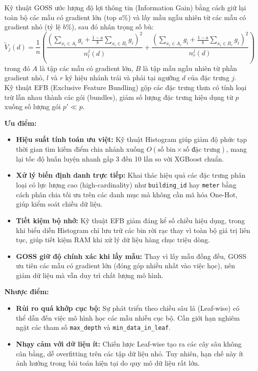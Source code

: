 Kỹ thuật GOSS ước lượng độ lợi thông tin (Information Gain) bằng cách giữ lại toàn bộ các mẫu có gradient lớn (top $a\%$) và lấy mẫu ngẫu nhiên từ các mẫu có gradient nhỏ (tỷ lệ $b\%$), sau đó nhân trọng số bù:
\begin{equation*}
    \widetilde{V}_j(d) = \frac{1}{n} \left( \frac{\left(\sum_{x_i \in A_l} g_i + \frac{1-a}{b} \sum_{x_i \in B_l} g_i\right)^2}{n_l^j(d)} + \frac{\left(\sum_{x_i \in A_r} g_i + \frac{1-a}{b} \sum_{x_i \in B_r} g_i\right)^2}{n_r^j(d)} \right)
\end{equation*}
trong đó $A$ là tập các mẫu có gradient lớn, $B$ là tập mẫu ngẫu nhiên từ phần gradient nhỏ, $l$ và $r$ ký hiệu nhánh trái và phải tại ngưỡng $d$ của đặc trưng $j$.\\

Kỹ thuật EFB (Exclusive Feature Bundling) gộp các đặc trưng thưa có tính loại trừ lẫn nhau thành các gói (bundles), giảm số lượng đặc trưng hiệu dụng từ $p$ xuống số lượng gói $p' \ll p$.

\textbf{Ưu điểm:}
\begin{itemize}
    \item \textbf{Hiệu suất tính toán ưu việt:} Kỹ thuật Histogram giúp giảm độ phức tạp thời gian tìm kiếm điểm chia nhánh xuống $O(\text{số bin} \times \text{số đặc trưng})$, mang lại tốc độ huấn luyện nhanh gấp 3 đến 10 lần so với XGBoost chuẩn.
    \item \textbf{Xử lý biến định danh trực tiếp:} Khai thác hiệu quả các đặc trưng phân loại có lực lượng cao (high-cardinality) như \texttt{building\_id} hay \texttt{meter} bằng cách phân chia tối ưu trên các danh mục mà không cần mã hóa One-Hot, giúp kiểm soát chiều dữ liệu.
    \item \textbf{Tiết kiệm bộ nhớ:} Kỹ thuật EFB giảm đáng kể số chiều hiệu dụng, trong khi biểu diễn Histogram chỉ lưu trữ các bin rời rạc thay vì toàn bộ giá trị liên tục, giúp tiết kiệm RAM khi xử lý dữ liệu hàng chục triệu dòng.
    \item \textbf{GOSS giữ độ chính xác khi lấy mẫu:} Thay vì lấy mẫu đồng đều, GOSS ưu tiên các mẫu có gradient lớn (đóng góp nhiều nhất vào việc học), nên giảm dữ liệu mà vẫn duy trì chất lượng mô hình.
\end{itemize}

\textbf{Nhược điểm:}
\begin{itemize}
    \item \textbf{Rủi ro quá khớp cục bộ:} Sự phát triển theo chiều sâu lá (Leaf-wise) có thể dẫn đến việc mô hình học các mẫu nhiễu cục bộ. Cần giới hạn nghiêm ngặt các tham số \texttt{max\_depth} và \texttt{min\_data\_in\_leaf}.
    \item \textbf{Nhạy cảm với dữ liệu ít:} Chiến lược Leaf-wise tạo ra các cây sâu không cân bằng, dễ overfitting trên các tập dữ liệu nhỏ. Tuy nhiên, hạn chế này ít ảnh hưởng trong bài toán hiện tại do quy mô dữ liệu rất lớn.
\end{itemize}

